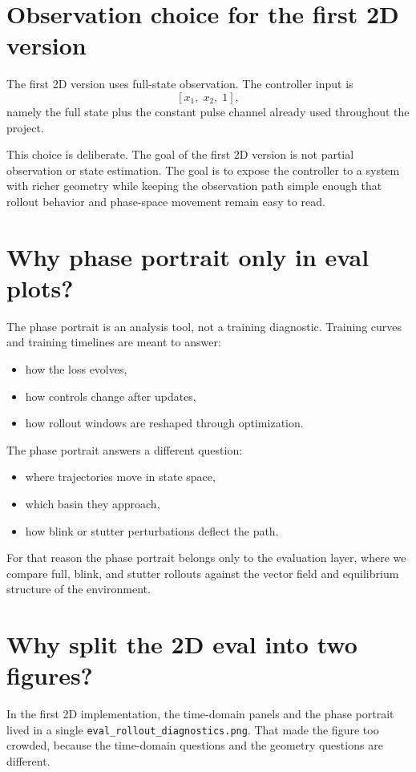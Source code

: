 \section{Observation choice for the first 2D version}

The first 2D version uses full-state observation. The controller input is
\[
[x_1,\; x_2,\; 1],
\]
namely the full state plus the constant pulse channel already used throughout the project.

This choice is deliberate. The goal of the first 2D version is not partial observation or state estimation. The goal is to expose the controller to a system with richer geometry while keeping the observation path simple enough that rollout behavior and phase-space movement remain easy to read.

\section{Why phase portrait only in eval plots?}

The phase portrait is an analysis tool, not a training diagnostic. Training curves and training timelines are meant to answer:
\begin{itemize}
    \item how the loss evolves,
    \item how controls change after updates,
    \item how rollout windows are reshaped through optimization.
\end{itemize}

The phase portrait answers a different question:
\begin{itemize}
    \item where trajectories move in state space,
    \item which basin they approach,
    \item how blink or stutter perturbations deflect the path.
\end{itemize}

For that reason the phase portrait belongs only to the evaluation layer, where we compare full, blink, and stutter rollouts against the vector field and equilibrium structure of the environment.

\section{Why split the 2D eval into two figures?}

In the first 2D implementation, the time-domain panels and the phase portrait lived in a single \texttt{eval\_rollout\_diagnostics.png}. That made the figure too crowded, because the time-domain questions and the geometry questions are different.

